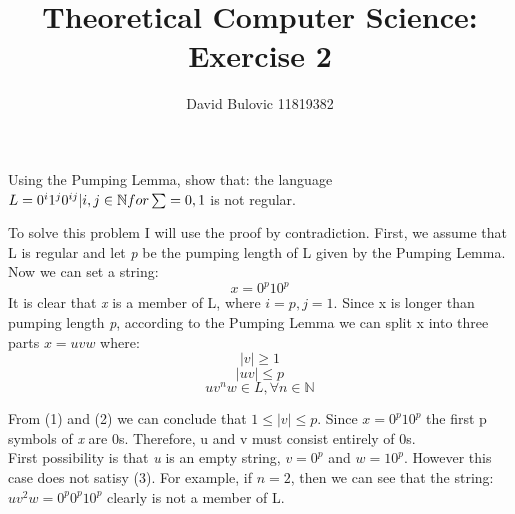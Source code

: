 \documentclass{article}
\title {Theoretical Computer Science: Exercise 2}
\author {David Bulovic 11819382}
\date {}
\begin{document}
\maketitle
Using the Pumping Lemma, show that: the language \begin{math} L = {0^i1^j0^{ij} | i, j \in \mathbb{N} } \\for \sum = {0, 1} \end{math} 
is not regular.\\ \par
To solve this problem I will use the proof by contradiction. First, we assume that L is regular and let \textit{p} be the pumping
length of L given by the Pumping Lemma. Now we can set a string: 
\begin{equation*}
x = 0^p10^p
\end{equation*}
It is clear that \textit{x} is a member of L, where \begin{math} i = p, j = 1 \end{math}. Since x is longer than pumping length \textit{p},
according to the Pumping Lemma we can split x into three parts \begin{math} x = uvw \end{math} where: 
\begin{equation} 
|v| \geq 1
\end{equation}
\begin{equation}
|uv| \leq p
\end{equation}
\begin{equation}
uv^nw \in L, \forall n \in \mathbb{N}
\end{equation} \par
From (1) and (2) we can conclude that \begin{math} 1 \leq |v| \leq p \end{math}. Since \begin{math} x = 0^p10^p \end{math} the first p symbols of
\textit{x} are 0s. Therefore, u and v must consist entirely of 0s. \\First possibility is that \textit{u} is an empty string,
\begin{math} v = 0^p \end{math} and \begin{math} w = 10^p \end{math}. However this case does not satisy (3). For example, if 
\begin{math} n = 2 \end{math}, then we can see that the string: \begin{math} uv^2w = 0^p0^p10^p \end{math} clearly is not a member of L. \\ \par
\end{document}
